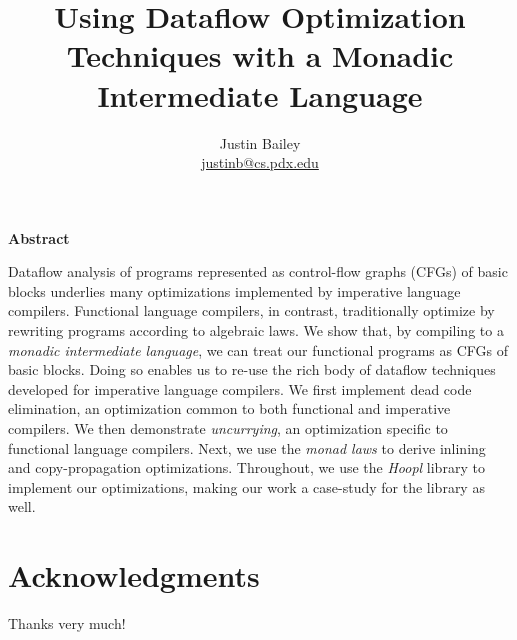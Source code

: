 \dodocclass



\date{}
\author{Justin Bailey \\ \url{justinb@cs.pdx.edu}}
\title{Using Dataflow Optimization Techniques with a Monadic Intermediate Language}
\maketitle 

\pagestyle{plain}
\begin{center}
  {\sffamily\bfseries Abstract}
\end{center}
\bigskip
\noindent
Dataflow analysis of programs represented as control-flow graphs
(CFGs) of basic blocks underlies many optimizations implemented by
imperative language compilers. Functional language compilers, in
contrast, traditionally optimize by rewriting programs according to
algebraic laws. We show that, by compiling to a \emph{monadic
  intermediate language}, we can treat our functional programs as CFGs
of basic blocks. Doing so enables us to re-use the rich body of
dataflow techniques developed for imperative language compilers. We
first implement dead code elimination, an optimization common to both
functional and imperative compilers. We then demonstrate
\emph{uncurrying}, an optimization specific to functional language
compilers. Next, we use the \emph{monad laws} to derive inlining and
copy-propagation optimizations.  Throughout, we use the \emph{Hoopl}
library to implement our optimizations, making our work a case-study
for the library as well.
\newpage

\section*{Acknowledgments}
Thanks very much!
\newpage

\singlespacing
\tableofcontents
\newpage
{}
\listoffigures
\newpage

